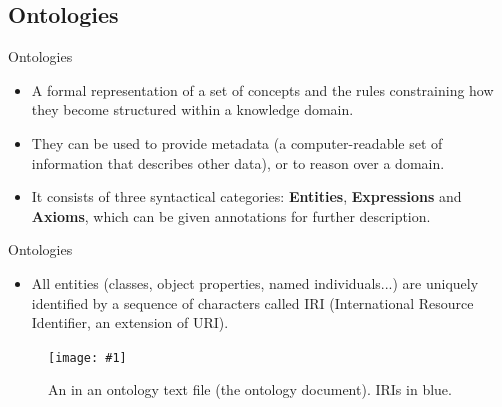 \documentclass[english, xcolor=dvipsnames, aspectratio=169]{beamer}
\newcommand{\includefigurelarger}[2]
{
    \begin{figure}[h]
    \caption{#2}
    \centering
    \texttt{[image: \#1]}
    \end{figure}
}
\newcommand{\subsectiontitle}{}
\begin{document}
% 
\renewcommand{\subsectiontitle}{Ontologies}
\subsection{\subsectiontitle}
\begin{frame}{\subsectiontitle}
 			\begin{itemize}
\item A formal representation of a set of concepts and the rules constraining how they become structured within a knowledge domain.  \cite{krotzsch_description_2013}  
\item They can be used to provide metadata (a computer-readable set of information that describes other data), or to reason over a domain.
\item It consists of three syntactical categories: \textbf{Entities}, \textbf{Expressions} and \textbf{Axioms}, which can be given annotations for further description. \cite{noauthor_owl_nodate}
    		\end{itemize}

\end{frame}




% 


\begin{frame}{\subsectiontitle}
\begin{itemize}
\item All entities (classes, object properties, named individuals...) are uniquely identified by a sequence of characters called IRI (International Resource Identifier, an extension of URI).

\end{itemize}

 \includefigurelarger{class.pdf}{An  in an ontology text file (the ontology document). IRIs in blue.}
\end{frame}

%
\end{document}

